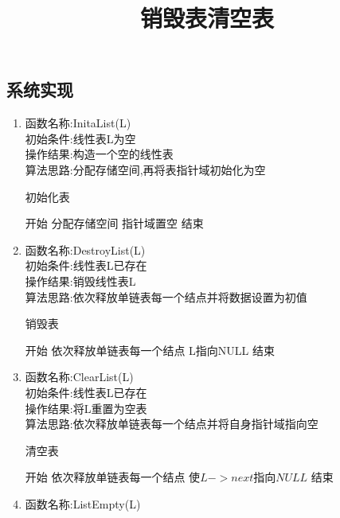 \documentclass[supercite]{HustGraduPaper}
\theoremstyle{definition}
\begin{document}
\subsection{系统实现}
\begin{enumerate}
	\renewcommand{\labelenumi}{Code:\theenumi}
	\item 函数名称:InitaList(L)\\
	      初始条件:线性表L为空\\
	      操作结果:构造一个空的线性表\\
	      算法思路:分配存储空间,再将表指针域初始化为空
	      \begin{algorithm}[htb]
		      \caption{初始化表}
		      \begin{algorithmic}[1]
			      \State 开始
			      \State 分配存储空间
			      \State 指针域置空
			      \State 结束
		      \end{algorithmic}\label{L1}
	      \end{algorithm}
	\item 函数名称:DestroyList(L)\\
	      初始条件:线性表L已存在\\
	      操作结果:销毁线性表L\\
	      算法思路:依次释放单链表每一个结点并将数据设置为初值
	      \begin{algorithm}[htb]
		      \title{销毁表}
		      \caption{销毁表}
		      \begin{algorithmic}[1]
			      \State 开始
			      \State 依次释放单链表每一个结点
			      \State L指向NULL
			      \State 结束
		      \end{algorithmic}\label{L2}
	      \end{algorithm}
	      \newpage
	\item 函数名称:ClearList(L)\\
	      初始条件:线性表L已存在\\
	      操作结果:将L重置为空表\\
	      算法思路:依次释放单链表每一个结点并将自身指针域指向空
	      \begin{algorithm}[htb]
		      \title{清空表}
		      \caption{清空表}
		      \begin{algorithmic}[1]
			      \State 开始
			      \State 依次释放单链表每一个结点
			      \State 使$L->next$指向$NULL$
			      \State 结束
		      \end{algorithmic}\label{L3}
	      \end{algorithm}
	\item 函数名称:ListEmpty(L)\\

\end{enumerate}
\end{document}
